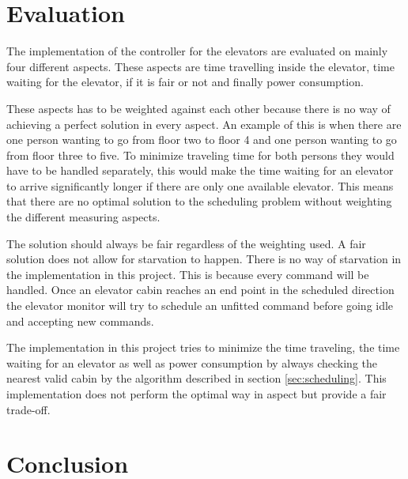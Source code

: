 \documentclass[10pt,a4paper]{article}
\begin{document}
\section{Evaluation}
\label{sec:eval}
The implementation of the controller for the elevators are evaluated on mainly four different aspects. These aspects are time travelling inside the elevator, time waiting for the elevator, if it is fair or not and finally power consumption.

These aspects has to be weighted against each other because there is no way of achieving a perfect solution in every aspect. An example of this is when there are one person wanting to go from floor two to floor 4 and one person wanting to go from floor three to five. To minimize traveling time for both persons they would have to be handled separately, this would make the time waiting for an elevator to arrive significantly longer if there are only one available elevator. This means that there are no optimal solution to the scheduling problem without weighting the different measuring aspects.

The solution should always be fair regardless of the weighting used. A fair solution does not allow for starvation to happen. There is no way of starvation in the implementation in this project. This is because every command will be handled. Once an elevator cabin reaches an end point in the scheduled direction the elevator monitor will try to schedule an unfitted command before going idle and accepting new commands.

The implementation in this project tries to minimize the time traveling, the time waiting for an elevator as well as power consumption by always checking the nearest valid cabin by the algorithm described in section \ref{sec:scheduling}. This implementation does not perform the optimal way in aspect but provide a fair trade-off.

\section{Conclusion}
\label{sec:conclusion}
\end{document}
